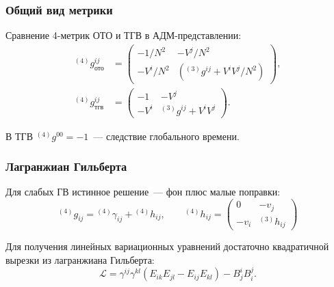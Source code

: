 \documentclass[compress]{beamer}
\begin{document}
    \begin{frame}\frametitle{Общий вид метрики}

        Сравнение 4-метрик ОТО и ТГВ в АДМ-представлении:
        \begin{equation*}\begin{aligned}
            {}^{(4)}g^{ij}_\text{ото} &= \begin{pmatrix}
                - 1/N^2   & - V^j/N^2                   \\
                - V^i/N^2 & ({}^{(3)}g^{ij} + V^i V^j / N^2)
            \end{pmatrix}, \\
            {}^{(4)}g^{ij}_\text{тгв} &= \begin{pmatrix}
                - 1   & - V^j                           \\
                - V^i & {}^{(3)}g^{ij} + V^i V^j
            \end{pmatrix} .
        \end{aligned}\end{equation*}

        В ТГВ ${}^{(4)}g^{00} = -1$~--- следствие глобального времени.

    \end{frame}

    \begin{frame}\frametitle{Лагранжиан Гильберта}

        Для слабых ГВ истинное решение~--- фон плюс малые поправки:
        \begin{equation*}
            {}^{(4)}g_{ij} = {}^{(4)}\gamma_{ij} + {}^{(4)}h_{ij}, \qquad
            {}^{(4)}h_{ij} = \begin{pmatrix}
                0    & - v_j          \\
                -v_i & {}^{(3)}h_{ij}
            \end{pmatrix}
        \end{equation*}

        Для получения линейных вариационных уравнений достаточно квадратичной вырезки из лагранжиана Гильберта:
        \begin{equation}
            \mathcal{L} = \gamma^{ij}\gamma^{kl} (E_{ik}E_{jl} - E_{ij}E_{kl}) - B^i_j B_i^j .
        \end{equation}

    \end{frame}
\end{document}
